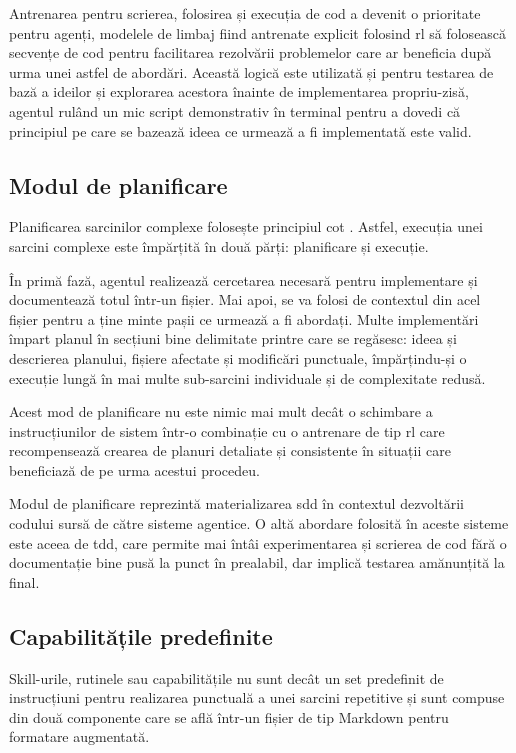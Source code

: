 \documentclass[12pt, a4paper, oneside, romanian]{teza-upb}
\begin{document}
    Antrenarea pentru scrierea, folosirea și execuția de cod a devenit o prioritate pentru agenți, modelele de limbaj fiind antrenate explicit folosind \ac{rl} să folosească secvențe de cod pentru facilitarea rezolvării problemelor care
    ar beneficia după urma unei astfel de abordări. Această logică este utilizată și pentru testarea de bază a ideilor și explorarea acestora înainte de implementarea propriu-zisă, agentul rulând un mic script demonstrativ în terminal pentru
    a dovedi că principiul pe care se bazează ideea ce urmează a fi implementată este valid.

    \subsection{Modul de planificare}

    Planificarea sarcinilor complexe folosește principiul \ac{cot} \cite{weiChainofThoughtPromptingElicits2022}. Astfel, execuția unei sarcini complexe este împărțită în două părți: planificare și execuție.

    În primă fază, agentul realizează cercetarea necesară pentru implementare și documentează totul într-un fișier. Mai apoi, se va folosi de contextul din acel fișier pentru a ține minte pașii ce urmează a fi abordați.
    Multe implementări împart planul în secțiuni bine delimitate printre care se regăsesc: ideea și descrierea planului, fișiere afectate și modificări punctuale, împărțindu-și
    o execuție lungă în mai multe sub-sarcini individuale și de complexitate redusă.

    Acest mod de planificare nu este nimic mai mult decât o schimbare a instrucțiunilor de sistem într-o combinație cu o antrenare de tip \ac{rl} care recompensează crearea de planuri detaliate și consistente în situații care beneficiază de pe urma acestui procedeu.

    Modul de planificare reprezintă materializarea \ac{sdd} în contextul dezvoltării codului sursă de către sisteme agentice. O altă abordare folosită în aceste sisteme este aceea de \ac{tdd}, care permite mai întâi
    experimentarea și scrierea de cod fără o documentație bine pusă la punct în prealabil, dar implică testarea amănunțită la final.
  
    \subsection{Capabilitățile predefinite}

    Skill-urile, rutinele sau capabilitățile nu sunt decât un set predefinit de instrucțiuni pentru realizarea punctuală a unei sarcini repetitive
    și sunt compuse din două componente care se află într-un fișier de tip Markdown pentru formatare augmentată.
    
\end{document}
